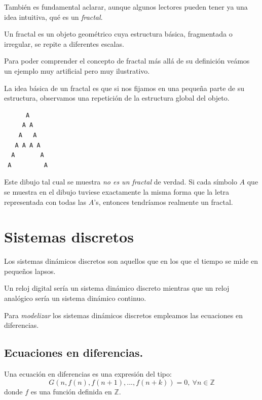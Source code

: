 También es fundamental aclarar, aunque algunos lectores pueden tener ya una idea intuitiva, qué es un \emph{fractal}.

\begin{definition}[Fractal]\label{def:fractal}
Un fractal es un objeto geométrico cuya estructura básica, fragmentada o irregular, se repite a diferentes escalas.
\end{definition}

Para poder comprender el concepto de fractal más allá de su definición veámos un ejemplo muy artificial pero muy ilustrativo.

\begin{example}
La idea básica de un fractal es que si nos fijamos en una pequeña parte de su estructura, observamos una repetición de la estructura global del objeto.

\begin{verbatim}
      A
     A A
    A   A
   A A A A
  A       A
 A         A
\end{verbatim}

Este dibujo tal cual se muestra \emph{no es un fractal} de verdad. Si cada símbolo $A$ que se muestra en el dibujo tuviese exactamente la misma forma que la letra representada con todas las $A$'s, entonces tendríamos realmente un fractal.
\end{example}

\section{Sistemas discretos}
\begin{definition}
Los sistemas dinámicos discretos son aquellos que en los que el tiempo se mide en pequeños lapsos.

Un reloj digital sería un sistema dinámico discreto mientras que un reloj analógico sería un sistema dinámico continuo.
\end{definition}

Para \emph{modelizar} los sistemas dinámicos discretos empleamos las ecuaciones en diferencias.

\subsection{Ecuaciones en diferencias.}

\begin{definition}
Una ecuación en diferencias es una expresión del tipo:
\[G(n,f(n),f(n+1),...,f(n+k))=0, \ \forall n \in \mathbb{Z}\]
donde $f$ es una función definida en $\mathbb{Z}$.
\end{definition}

